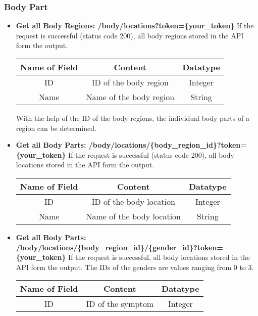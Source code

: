 \subsubsection{Body Part}
\begin{itemize}
	\item \textbf{Get all Body Regions:  /body/locations?token=\{your\_token\}}
	\newline
	If the request is successful (status code 200), all body regions stored in the API form the output.
	\begin{center}
		\begin{tabular}{ | c| c| c | } 
			\hline
			Name of Field& Content & Datatype \\ 
			\hline
			ID & ID of the body region & Integer \\ 
			\hline
			Name & Name of the body region & String \\ 
			\hline
		\end{tabular}
	\end{center}
	With the help of the ID of the body regions, the individual body parts of a region can be determined.
	\item \textbf{Get all Body Parts:  /body/locations/\{body\_region\_id\}?token=\{your\_token\}}
	\newline
	If the request is successful (status code 200), all body locations stored in the API form the output.
	\begin{center}
		\begin{tabular}{ | c| c| c | } 
			\hline
			Name of Field& Content & Datatype \\ 
			\hline
			ID & ID of the body location & Integer \\ 
			\hline
			Name & Name of the body location & String \\ 
			\hline
		\end{tabular}
	\end{center}
	\item \textbf{Get all Body Parts:  /body/locations/\{body\_region\_id\}/\{gender\_id\}?token=\{your\_token\}}
	\newline
	If the request is successful, all body locations stored in the API form the output. The IDs of the genders are values ranging from 0 to 3. 
	\begin{center}
		\scriptsize
		\begin{tabular}{ | c| c| c | } 
			\hline
			Name of Field& Content & Datatype \\ 
			\hline
			ID & ID of the symptom & Integer \\ 

\end{tabular}
\end{center}
\end{itemize}
